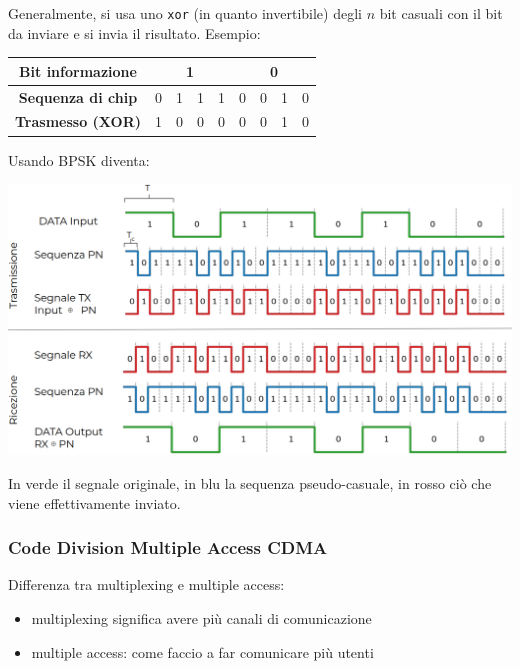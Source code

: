 Generalmente, si usa uno \texttt{xor} (in quanto invertibile) degli $n$ bit casuali con il bit da inviare e si invia il risultato. Esempio: 
\begin{center}
	\begin{tabular}{|c|c|c|c|c|c|c|c|c|}
		\hline
		\multicolumn{1}{|c|}{\textbf{Bit informazione}} & \multicolumn{4}{c|}{\textbf{1}} & \multicolumn{4}{c|}{\textbf{0}} \\ 
		\hline
		\textbf{Sequenza di chip} & 0 & 1 & 1 & 1 & 0 & 0 & 1 & 0 \\ 
		\hline
		\textbf{Trasmesso (XOR)} & 1 & 0 & 0 & 0 & 0 & 0 & 1 & 0\\ 
		\hline
	\end{tabular}
\end{center}
Usando BPSK diventa: 
\begin{center}
	\includegraphics[width=0.95\linewidth]{img/wireless/DSSS1}
\end{center}
In verde il {\color{green} segnale originale}, in blu la {\color{blue} sequenza pseudo-casuale}, in rosso ciò che viene {\color{red} effettivamente inviato}.\\



\newpage

\subsubsection{Code Division Multiple Access CDMA}
Differenza tra multiplexing e multiple access:
\begin{itemize}
	\item multiplexing significa avere più canali di comunicazione
	\item multiple access: come faccio a far comunicare più utenti 
\end{itemize}

